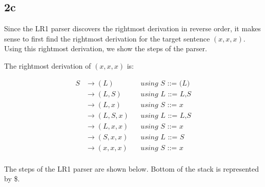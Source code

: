\documentclass{article}
\begin{document}
    \subsection*{2c}
    Since the LR1 parser discovers the rightmost derivation in reverse order, it makes sense to first find the rightmost derivation for the target sentence $(x,x,x)$. Using this rightmost derivation, we show the steps of the parser.

    The rightmost derivation of $(x,x,x)$ is:

    \begin{align*}
        S   & \rightarrow (L)       && \textit{using S ::= (L)} \\
            & \rightarrow (L,S)     && \textit{using L ::= L,S} \\
            & \rightarrow (L,x)     && \textit{using S ::= x} \\
            & \rightarrow (L,S,x)   && \textit{using L ::= L,S} \\
            & \rightarrow (L,x,x)   && \textit{using S ::= x} \\
            & \rightarrow (S,x,x)   && \textit{using L ::= S} \\
            & \rightarrow (x,x,x)   && \textit{using S ::= x} \\
    \end{align*}

    The steps of the LR1 parser are shown below. Bottom of the stack is represented by \$.
\end{document}
